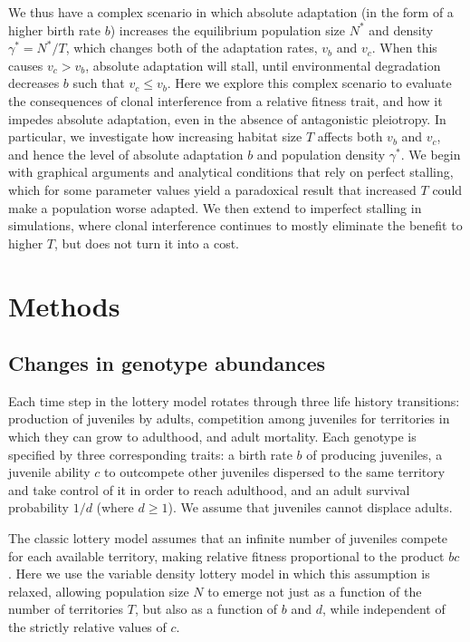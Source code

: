\documentclass[9pt,twocolumn,twoside,lineno]{gsajnl}
\begin{document}
We thus have a complex scenario in which absolute adaptation (in the form of a higher birth rate $b$) increases the equilibrium population size $N^*$ and density $\gamma^*=N^*/T$, which changes both of the adaptation rates, $v_b$ and $v_c$. When this causes $v_c>v_b$, absolute adaptation will stall, until environmental degradation decreases $b$ such that $v_c \leq v_b$. Here we explore this complex scenario to evaluate the consequences of clonal interference from a relative fitness trait, and how it impedes absolute adaptation, even in the absence of antagonistic pleiotropy. In particular, we investigate how increasing habitat size $T$ affects both $v_b$ and $v_c$, and hence the level of absolute adaptation $b$ and population density $\gamma^*$. We begin with graphical arguments and analytical conditions that rely on perfect stalling, which for some parameter values yield a paradoxical result that increased $T$ could make a population worse adapted. We then extend to imperfect stalling in simulations, where clonal interference continues to mostly eliminate the benefit to higher $T$, but does not turn it into a cost.

\section{Methods} \label{sec:methods}

\subsection{Changes in genotype abundances}

Each time step in the lottery model rotates through three life history transitions: production of juveniles by adults, competition among juveniles for territories in which they can grow to adulthood, and adult mortality. Each genotype is specified by three corresponding traits: a birth rate $b$ of producing juveniles,  a juvenile ability $c$ to outcompete  other juveniles dispersed to the same territory and take control of it in order to reach adulthood, and an adult survival probability $1/d$ (where $d\ge1$). We assume that juveniles cannot displace adults.

The classic lottery model assumes that an infinite number of juveniles compete for each available territory, making relative fitness proportional to the product $bc$ \citep{ChessonWarner1981}. Here we use the variable density lottery model \citep{bertram2019density} in which this assumption is relaxed, allowing population size $N$ to emerge not just as a function of the number of territories $T$, but also as a function of $b$ and $d$, while independent of the strictly relative values of $c$. 
\end{document}
